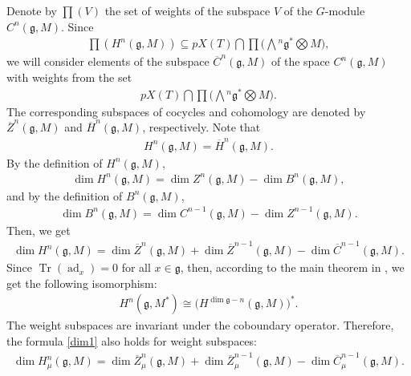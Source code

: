 \documentclass[pdftex]{sigma}%
\numberwithin{equation}{section}
\begin{document}
Denote by $\prod(V)$
the set of weights of the subspace $V$ of the $G$-module $C^{n}(\mathfrak{g},M)$.
Since
\begin{gather*}
\prod(H^n(\mathfrak{g},M))\subseteq
pX(T)\bigcap\prod\Big(\bigwedge{^n}\mathfrak{g}^*\bigotimes M\Big),
\end{gather*}
we will consider
elements of the subspace $\overline{C}^n(\mathfrak{g},M)$ of the space $C^n(\mathfrak{g},M)$ with weights from the set
\begin{gather*}
pX(T)\bigcap\prod\Big(\bigwedge{^n}\mathfrak{g}^*\bigotimes M\Big).
\end{gather*}
The corresponding subspaces of cocycles
and cohomology are denoted by $\overline{Z}^n\!(\mathfrak{g},M)$ and $\overline{H}^n\!(\mathfrak{g},M)$, respectively. Note that
\begin{gather*}
H^n(\mathfrak{g},M)=\overline{H}^n(\mathfrak{g},M).
\end{gather*}
By the definition of $H^n(\mathfrak{g},M)$,
\begin{gather*}\dim H^n(\mathfrak{g},M)=\dim Z^n(\mathfrak{g},M)-\dim B^{n}(\mathfrak{g},M),\end{gather*} and by the definition of $B^{n}(\mathfrak{g},M)$,
\begin{gather*}\dim B^{n}(\mathfrak{g},M)=\dim C^{n-1}(\mathfrak{g},M)-\dim Z^{n-1}(\mathfrak{g},M).\end{gather*} Then, we get
\begin{gather}
\dim H^n(\mathfrak{g},M)=\dim \overline{Z}^n(\mathfrak{g},M)+\dim
\overline{Z}^{n-1}(\mathfrak{g},M)-\dim \overline{C}^{n-1}(\mathfrak{g},M).\label{dim1}
\end{gather}
Since $\operatorname{Tr}(\operatorname{ad}_x)=0$ for all $x\in \mathfrak{g}$, then, according to the main theorem in \cite[p.~639]{H70},
we get the following isomorphism:
\begin{gather}
H^n(\mathfrak{g},M^*)\cong \big(H^{\dim \mathfrak{g}-n}(\mathfrak{g},M)\big)^*.\label{is1}
\end{gather}
The weight subspaces are invariant under the coboundary operator. Therefore, the formula \eqref{dim1} also holds for weight
subspaces:
\begin{gather}
\dim H^n_{\mu}(\mathfrak{g},M)=\dim \overline{Z}^n_{\mu}(\mathfrak{g},M)+\dim
\overline{Z}^{n-1}_{\mu}(\mathfrak{g},M)-\dim \overline{C}^{n-1}_{\mu}(\mathfrak{g},M).\label{dim3}
\end{gather}
\end{document}

